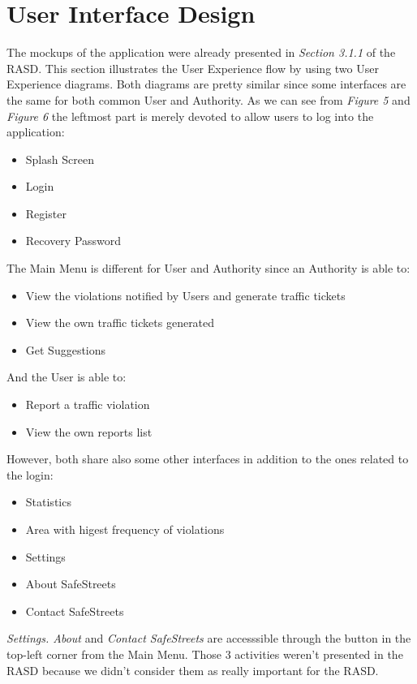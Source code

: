 \section{User Interface Design}
  The mockups of the application were already presented in \textit{Section 3.1.1} of the RASD. This section illustrates the User Experience flow by using two User Experience diagrams. Both diagrams are pretty similar since some interfaces are the same for both common User and Authority. As we can see from \textit{Figure 5} and \textit{Figure 6} the leftmost part is merely devoted to allow users to log into the application:
\begin{itemize}
\item Splash Screen%
\item Login%
\item Register
\item Recovery Password
\end{itemize}
\vspace{4mm}
The Main Menu is different for User and Authority since an Authority is able to:
\begin{itemize}
\item View the violations notified by Users and generate traffic tickets
\item View the own traffic tickets generated
\item Get Suggestions
\end{itemize}
And the User is able to:
\begin{itemize}
\item Report a traffic violation
\item View the own reports list
\end{itemize}
However, both share also some other interfaces in addition to the ones related to the login:
\begin{itemize}
    \item Statistics
    \item Area with higest frequency of violations
    \item Settings
    \item About SafeStreets
    \item Contact SafeStreets
\end{itemize}
\textit{Settings. About} and \textit{Contact SafeStreets} are accesssible through the button in the top-left corner from the Main Menu. Those 3 activities weren't presented in the RASD because we didn't consider them as really important for the RASD. 
